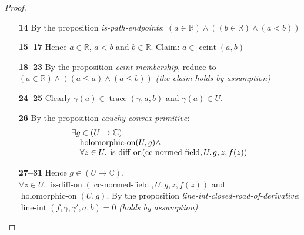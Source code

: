 \documentclass[11pt]{article}
\theoremstyle{plain}
\begin{document}
\begin{proof}
\begin{itemize}[leftmargin=2.8em, itemsep=4pt, parsep=1pt]
  \item[\textbf{14}] By the proposition \emph{is-path-endpoints}: $(a \in \mathbb{R}) \wedge ((b \in \mathbb{R}) \wedge (a < b))$
  \item[\textbf{15--17}] Hence $a \in \mathbb{R}$, $a < b$ and $b \in \mathbb{R}$. Claim: $a \in \operatorname{ccint}(a, b)$
  \item[\textbf{18--23}] By the proposition \emph{ccint-membership}, reduce to $(a \in \mathbb{R}) \wedge ((a \leq a) \wedge (a \leq b))$  \emph{(the claim holds by assumption)}
  \item[\textbf{24--25}] Clearly $\gamma(a) \in \operatorname{trace}(\gamma, a, b)$ and $\gamma(a) \in U$.
  \item[\textbf{26}] By the proposition \emph{cauchy-convex-primitive}:
\begin{equation*}
\begin{array}{@{}l@{}} \exists g \in (U \to \mathbb{C}). \\ \quad \operatorname{holomorphic\text{-}on}(U, g) \wedge \\ \quad \forall z \in U.\; \operatorname{is\text{-}diff\text{-}on}(\operatorname{cc\text{-}normed\text{-}field}, U, g, z, f(z)) \end{array}
\end{equation*}

  \item[\textbf{27--31}] Hence $g \in (U \to \mathbb{C})$, $\forall z \in U.\; \operatorname{is\text{-}diff\text{-}on}(\operatorname{cc\text{-}normed\text{-}field}, U, g, z, f(z))$ and $\operatorname{holomorphic\text{-}on}(U, g)$. By the proposition \emph{line-int-closed-road-of-derivative}: $\operatorname{line\text{-}int}(f, \gamma, \gamma', a, b) = 0$  \emph{(holds by assumption)}
\end{itemize}
\end{proof}
\end{document}
